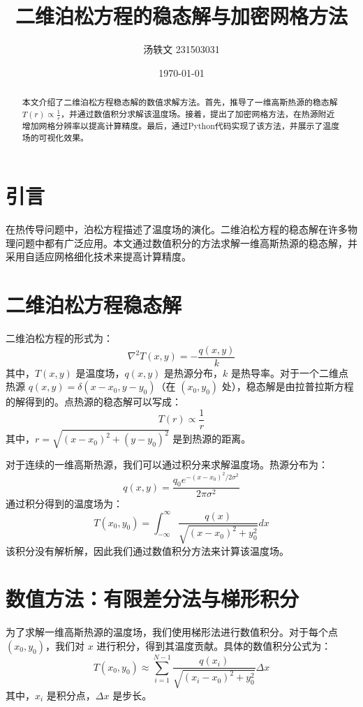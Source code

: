 

\title{二维泊松方程的稳态解与加密网格方法}
\author{汤轶文 231503031}
\date{\today}



\maketitle

\begin{abstract}
    本文介绍了二维泊松方程稳态解的数值求解方法。首先，推导了一维高斯热源的稳态解 \( T(r) \propto \frac{1}{r} \)，并通过数值积分求解该温度场。接着，提出了加密网格方法，在热源附近增加网格分辨率以提高计算精度。最后，通过Python代码实现了该方法，并展示了温度场的可视化效果。
    \end{abstract}
    
    \section{引言}
    在热传导问题中，泊松方程描述了温度场的演化。二维泊松方程的稳态解在许多物理问题中都有广泛应用。本文通过数值积分的方法求解一维高斯热源的稳态解，并采用自适应网格细化技术来提高计算精度。
    
    \section{二维泊松方程稳态解}
    二维泊松方程的形式为：
    \[
    \nabla^2 T(x, y) = -\frac{q(x, y)}{k}
    \]
    其中，\( T(x, y) \) 是温度场，\( q(x, y) \) 是热源分布，\( k \) 是热导率。对于一个二维点热源 \( q(x, y) = \delta(x - x_0, y - y_0) \)（在 \( (x_0, y_0) \) 处），稳态解是由拉普拉斯方程的解得到的。点热源的稳态解可以写成：
    \[
    T(r) \propto \frac{1}{r}
    \]
    其中，\( r = \sqrt{(x - x_0)^2 + (y - y_0)^2} \) 是到热源的距离。
    
    对于连续的一维高斯热源，我们可以通过积分来求解温度场。热源分布为：
    \[
    q(x, y) = \frac{q_0 e^{-(x - x_0)^2 / 2\sigma^2}}{2\pi \sigma^2}
    \]
    通过积分得到的温度场为：
    \[
    T(x_0, y_0) = \int_{-\infty}^{\infty} \frac{q(x)}{\sqrt{(x - x_0)^2 + y_0^2}} dx
    \]
    该积分没有解析解，因此我们通过数值积分方法来计算该温度场。
    
    \section{数值方法：有限差分法与梯形积分}
    为了求解一维高斯热源的温度场，我们使用梯形法进行数值积分。对于每个点 \( (x_0, y_0) \)，我们对 \( x \) 进行积分，得到其温度贡献。具体的数值积分公式为：
    \[
    T(x_0, y_0) \approx \sum_{i=1}^{N-1} \frac{q(x_i)}{\sqrt{(x_i - x_0)^2 + y_0^2}} \Delta x
    \]
    其中，\( x_i \) 是积分点，\( \Delta x \) 是步长。

